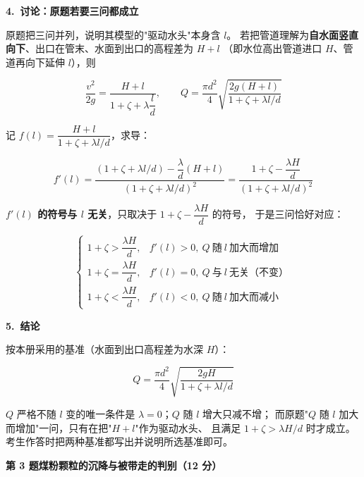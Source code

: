 \begin{jie}
\textbf{4.\ 讨论：原题若要三问都成立}

原题把三问并列，说明其模型的"驱动水头"本身含 $l$。
若把管道理解为\textbf{自水面竖直向下}、出口在管末、水面到出口的高程差为 $H+l$
（即水位高出管道进口 $H$、管道再向下延伸 $l$），则

\[ \frac{v^2}{2g}=\frac{H+l}{1+\zeta+\lambda\dfrac{l}{d}},\qquad
Q=\frac{\pi d^2}{4}\sqrt{\frac{2g(H+l)}{1+\zeta+\lambda l/d}} \]

记 $f(l)=\dfrac{H+l}{1+\zeta+\lambda l/d}$，求导：

\[ f'(l)=\frac{\left(1+\zeta+\lambda l/d\right)-\dfrac{\lambda}{d}(H+l)}
{\left(1+\zeta+\lambda l/d\right)^2}
=\frac{1+\zeta-\dfrac{\lambda H}{d}}{\left(1+\zeta+\lambda l/d\right)^2} \]

\textbf{$f'(l)$ 的符号与 $l$ 无关}，只取决于 $1+\zeta-\dfrac{\lambda H}{d}$ 的符号，
于是三问恰好对应：

\[ \begin{cases}
1+\zeta>\dfrac{\lambda H}{d}, & f'(l)>0,\ Q\ \text{随}\ l\ \text{加大而增加}\\[6pt]
1+\zeta=\dfrac{\lambda H}{d}, & f'(l)=0,\ Q\ \text{与}\ l\ \text{无关（不变）}\\[6pt]
1+\zeta<\dfrac{\lambda H}{d}, & f'(l)<0,\ Q\ \text{随}\ l\ \text{加大而减小}
\end{cases} \]

\textbf{5.\ 结论}

按本册采用的基准（水面到出口高程差为水深 $H$）：

\[ Q=\frac{\pi d^2}{4}\sqrt{\frac{2gH}{1+\zeta+\lambda l/d}} \]

$Q$ 严格不随 $l$ 变的唯一条件是 $\lambda=0$；$Q$ 随 $l$ 增大只减不增；
而原题"$Q$ 随 $l$ 加大而增加"一问，只有在把"$H+l$"作为驱动水头、
且满足 $1+\zeta>\lambda H/d$ 时才成立。考生作答时把两种基准都写出并说明所选基准即可。
\end{jie}

\noindent\textbf{第 3 题\quad 煤粉颗粒的沉降与被带走的判别（12 分）}

